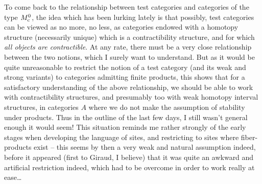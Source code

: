To come back to the relationship between test categories and
categories of the type $M_{\mathrm{c}}^0$, the idea which has been lurking
lately is that possibly, test categories can be viewed as no more, no
less, as categories endowed with a homotopy structure (necessarily
unique) which is a contractibility structure, and for which \emph{all
  objects are contractible}. At any rate, there must be a very close
relationship between the two notions, which I surely want to
understand. But as it would be quite unreasonable to restrict the
notion of a test category (and its weak and strong variants) to
categories admitting finite products, this shows that for a
satisfactory understanding of the above relationship, we should be
able to work with contractibility structures, and presumably too with
weak homotopy interval structures, in categories $A$ where we do not
make the assumption of stability under products. Thus in the outline
of the last few days, I still wasn't general enough it would seem!
This situation reminds me rather strongly of the early stages when
developing the language of sites, and restricting to sites where
fiber-products exist -- this seems by then a very weak and natural
assumption indeed, before it appeared (first to Giraud, I believe)
that it was quite an awkward and artificial restriction indeed, which
had to be overcome in order to work really at ease\ldots


